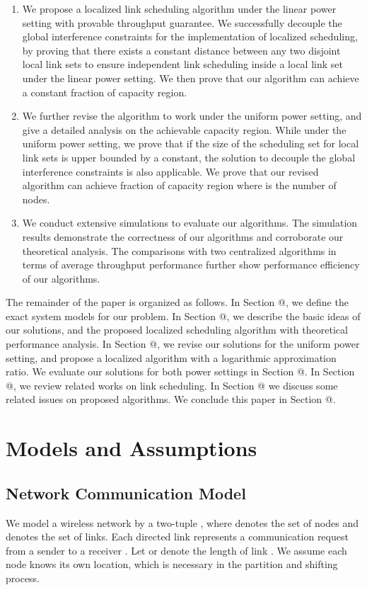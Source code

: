 \documentclass[journal]{IEEEtran}
\makeatletter
\newcommand{\Rmnum}[1]{\expandafter\@slowromancap\romannumeral #1@}
\makeatother
\begin{document}
\begin{enumerate}
    \item We propose a localized link scheduling algorithm under the linear power setting with provable throughput guarantee. We successfully decouple the global interference constraints for the implementation of localized scheduling, by proving that there exists a constant distance between any two disjoint local link sets to ensure independent link scheduling inside a local link set under the linear power setting. We then prove that our algorithm can achieve a constant fraction of capacity region.
  \item We further revise the algorithm to work under the uniform power setting, and give a detailed analysis on the achievable capacity region.  While under the uniform power setting, we prove that if the size of the scheduling set for local link sets is upper bounded by a constant, the solution to decouple the global interference constraints is also applicable. We prove that our revised algorithm can achieve  fraction of capacity region where  is the number of nodes.
  \item We conduct extensive simulations to evaluate our algorithms. The simulation results demonstrate the correctness of our algorithms and corroborate our theoretical analysis.  The comparisons with two centralized algorithms in terms of average throughput performance further show performance efficiency of our algorithms.
\end{enumerate}

The remainder of the paper is organized as follows. In Section \Rmnum{2}, we define the exact system models for our problem. In Section \Rmnum{3}, we describe the basic ideas of our solutions, and the proposed localized scheduling algorithm with theoretical performance analysis. In Section \Rmnum{4}, we revise our solutions for the uniform power setting, and propose a localized algorithm with a logarithmic approximation ratio. We evaluate our solutions for both power settings in Section \Rmnum{5}. In Section \Rmnum{6}, we review related works on link scheduling.
In Section \Rmnum{7} we discuss some related issues on proposed algorithms.
We conclude this paper in Section \Rmnum{8}.

\section{Models and Assumptions}

\subsection{Network Communication Model}
We model a wireless network by a two-tuple , where   denotes the set of nodes and   denotes the set of links. Each directed link   represents a communication request from a sender   to a receiver . Let   or   denote the length of link . We assume each node knows  its own location, which is necessary in the partition and shifting process.
\end{document}
